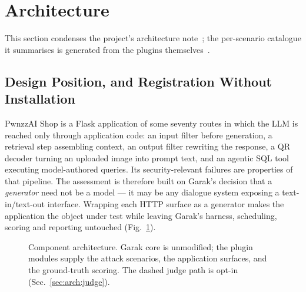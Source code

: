 %
\section{Architecture}
\label{sec:architecture}

This section condenses the project's architecture
note~\cite{pwnzzdocsarch}; the per-scenario catalogue it summarises is
generated from the plugins themselves~\cite{pwnzzdocsscen}.

\subsection{Design Position, and Registration Without Installation}
\label{sec:arch:position}

PwnzzAI Shop is a Flask application of some seventy routes in which the
LLM is reached only through application code: an input filter before
generation, a retrieval step assembling context, an output filter
rewriting the response, a QR decoder turning an uploaded image into
prompt text, and an agentic SQL tool executing model-authored queries.
Its security-relevant failures are properties of that pipeline. The
assessment is therefore built on Garak's decision that a
\emph{generator} need not be a model --- it may be any dialogue system
exposing a text-in/text-out interface. Wrapping each HTTP surface as a
generator makes the application the object under test while leaving
Garak's harness, scheduling, scoring and reporting untouched
(Fig.~\ref{fig:architecture}).

\begin{figure}[!htbp]
  \centering
  \caption{Component architecture. Garak core is unmodified; the
   plugin modules supply the attack scenarios, the
  application surfaces, and the ground-truth scoring. The dashed judge
  path is opt-in (Sec.~\ref{sec:arch:judge}).}
  \label{fig:architecture}
\end{figure}

